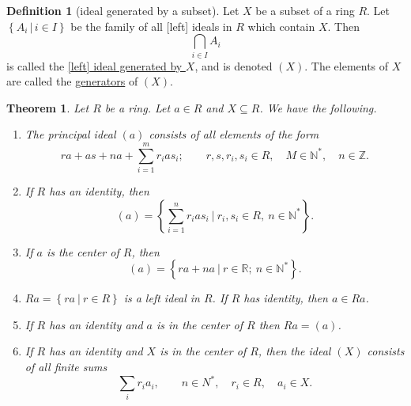 \documentclass[a4paper]{report}
\newcommand{\R}{\mathbb{R}}
\newcommand{\Z}{\mathbb{Z}}
\newcommand{\N}{\mathbb{N}}
\newcommand{\defn}[1]{\ul{#1}}
\theoremstyle{definition}
\newtheorem{definition}{Definition}[section]
\theoremstyle{plain}
\newtheorem{theorem}{Theorem}[section]
\theoremstyle{remark}
\begin{document}
\begin{definition}[ideal generated by a subset]
  \label{def:idealgenerated}
  Let $X$ be a subset of a ring $R$. Let $\left\{ A_{i}\,\big|\, i \in I \right\}$ be the family of all [left] ideals in $R$ which contain $X$. Then 
  \begin{equation*}
    \bigcap_{i \in I} A_{i}
  \end{equation*}
  is called the \defn{[left] ideal generated by $X$}, and is denoted $(X)$. The elements of $X$ are called the \defn{generators} of $(X)$.
\end{definition}
\begin{theorem}
  Let $R$ be a ring. Let $a \in R$ and $X \subseteq R$. We have the following.
  \begin{enumerate}
    \item The principal ideal $(a)$ consists of all elements of the form 
      \begin{equation*}
        ra + as + na  + \sum_{i=1}^{m} r_{i} a s_{i};\qquad r,s,r_{i}, s_{i} \in R,\quad M \in \N^{*},\quad n \in \Z.
      \end{equation*}

    \item If $R$ has an identity, then 
      \begin{equation*}
        (a) = \left\{ \sum_{i=1}^{n} r_{i} a s_{i} \ \biggr|\  r_{i}, s_{i} \in R,\ n \in \N^{*} \right\}.
      \end{equation*}

    \item If $a$ is the center of $R$, then
      \begin{equation*}
        (a) = \left\{ ra + na\ \big|\ r \in \R;\ n \in \N^{*} \right\}.
      \end{equation*}
    \item $Ra = \left\{ ra\ \big|\ r \in R \right\}$ is a left ideal in $R$. If $R$ has identity, then $a \in Ra$.

    \item If $R$ has an identity and $a$ is in the center of $R$ then $Ra = (a)$.
    \item If $R$ has an identity and $X$ is in the center of $R$, then the ideal $(X)$ consists of all finite sums 
      \begin{equation*}
        \sum_{i} r_{i} a_{i},\qquad n \in N^{*},\quad r_{i}\in R,\quad a_{i} \in X.
      \end{equation*}
  \end{enumerate}
\end{theorem}
\end{document}
